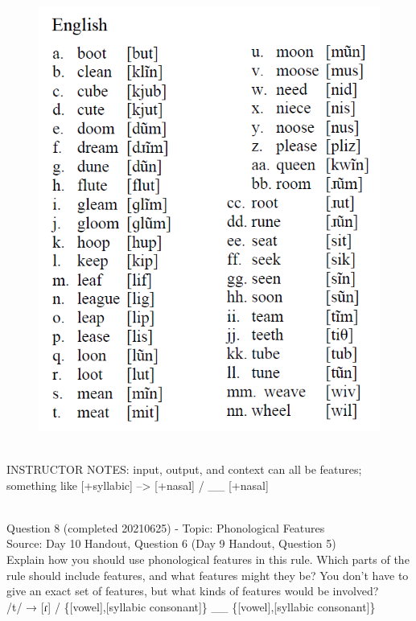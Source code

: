 \documentclass[12pt]{article}
\begin{document}
\begin{figure}[H]
\includegraphics{../images/english_nasalization.png}
\end{figure}

~\\
INSTRUCTOR NOTES: input, output, and context can all be features; something like [+syllabic] --> [+nasal] / \_\_ [+nasal]


~\\

{\large Question 8} (completed 20210625) - Topic: Phonological Features\\
Source: Day 10 Handout, Question 6 (Day 9 Handout, Question 5)\\

Explain how you should use phonological features in this rule. Which parts of the rule should include features, and what features might they be? You don't have to give an exact set of features, but what kinds of features would be involved?\\

/t/ → {[ɾ]} / \{{[vowel]},{[syllabic consonant]}\} \_\_ \{{[vowel]},{[syllabic consonant]}\}
\end{document}
